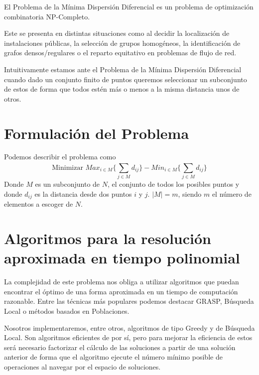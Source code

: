
El Problema de la Mínima Dispersión Diferencial es un problema de optimización combinatoria NP-Completo.\cite{Seminario2MH}

Este se presenta en distintas situaciones como al decidir la localización de instalaciones públicas,
la selección de grupos homogéneos, la identificación de grafos densos/regulares o el reparto equitativo en problemas de
flujo de red.\cite{DUARTE201546}

Intuitivamente estamos ante el Problema de la Mínima Dispersión Diferencial cuando dado un conjunto finito de puntos queremos
seleccionar un subconjunto de estos de forma que todos estén más o menos a la misma distancia unos de otros.

\section{Formulación del Problema}

Podemos describir el problema como
$$\textrm{Minimizar } Max_{i\in M}\{\sum_{j\in M}^{}d_{ij}\}-Min_{i\in M}\{\sum_{j\in M}^{}d_{ij}\} $$
Donde $M$ es un subconjunto de $N$, el conjunto de todos los posibles puntos y donde $d_{ij}$ es la distancia desde dos puntos $i$ y $j$.
$|M| = m$, siendo $m$ el número de elementos a escoger de $N$.

\section{Algoritmos para la resolución aproximada en tiempo polinomial}

La complejidad de este problema nos obliga a utilizar algoritmos que puedan encontrar el óptimo de una forma aproximada en un tiempo de computación razonable.
Entre las técnicas más populares podemos destacar GRASP, Búsqueda Local o métodos basados en Poblaciones.\cite{MDP2010}

Nosotros implementaremos, entre otros, algoritmos de tipo Greedy y de Búsqueda Local. Son algoritmos eficientes de por sí, pero para
mejorar la eficiencia de estos será necesario factorizar el cálculo de las soluciones a partir de una solución anterior de forma
que el algoritmo ejecute el número mínimo posible de operaciones al navegar por el espacio de soluciones.